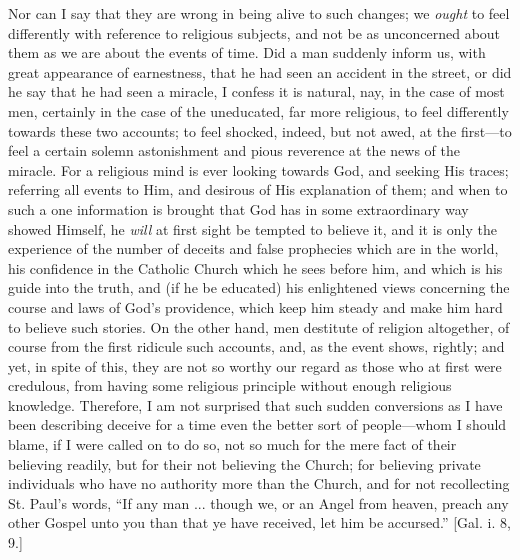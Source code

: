 Nor can I say that they are wrong in being alive to such changes;
we \emph{ought} to feel differently with reference to religious
subjects, and not be as unconcerned about them as we are about the
events of time. Did a man suddenly inform us, with great appearance of
earnestness, that he had seen an accident in the street, or did he say
that he had seen a miracle, I confess it is natural, nay, in the case
of most men, certainly in the case of the uneducated, far more
religious, to feel differently towards these two accounts; to feel
shocked, indeed, but not awed, at the first—to feel a certain solemn
astonishment and pious reverence at the news of the miracle. For a
religious mind is ever looking towards God, and seeking His traces;
referring all events to Him, and desirous of His explanation of them;
and when to such a one information is brought that God has in some
extraordinary way showed Himself, he \emph{will} at first sight be
tempted to believe it, and it is only the experience of the number of
deceits and false prophecies which are in the world, his confidence in
the Catholic Church which he sees before him, and which is his guide
into the truth, and (if he be educated) his enlightened views
concerning the course and laws of God's providence, which keep him
steady and make him hard to believe such stories. On the other hand,
men destitute of religion altogether, of course from the first
ridicule such accounts, and, as the event shows, rightly; and yet, in
spite of this, they are not so worthy our regard as those who at first
were credulous, from having some religious principle without enough
religious knowledge. Therefore, I am not surprised that such sudden
conversions as I have been describing deceive for a time even the
better sort of people—whom I should blame, if I were called on to do
so, not so much for the mere fact of their believing readily, but for
their not believing the Church; for believing private individuals who
have no authority more than the Church, and for not recollecting St.
Paul's words, ``If any man ... though we, or an Angel from heaven,
preach any other Gospel unto you than that ye have received, let him
be accursed.'' [Gal. i. 8, 9.]

